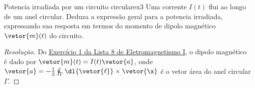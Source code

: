 \begin{exercício}{Potencia irradiada por um circuito circular}{ex3}
    Uma corrente \(I(t)\) flui ao longo de um anel circular. Deduza a expressão geral para a potencia irradiada, expressando sua resposta em termos do momento de dipolo magnético \(\vetor{m}(t)\) do circuito.
\end{exercício}
\begin{proof}[Resolução]
    Do \href{https://github.com/louisradial/4302303-eletromagnetismo-i/releases/tag/lista8}{Exercício 1 da Lista 8 de Eletromagnetismo I}, o dipolo magnético é dado por \(\vetor{m}(t) = I(t) \vetor{a}\), onde \(\vetor{a} = -\frac12 \oint_{\Gamma} \dl{\vetor{\ell}}\times \vetor{\x}\) é o vetor área do anel circular \(\Gamma.\)
\end{proof}
